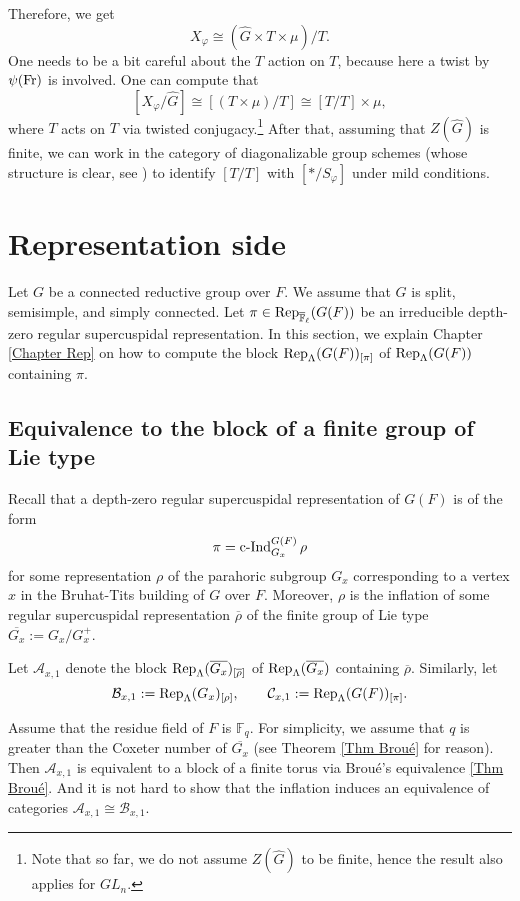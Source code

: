 Therefore, we get 
$$X_{\varphi} \cong \left(\hat{G} \times T \times \mu\right)/T.$$
One needs to be a bit careful about the $T$ action on $T$, because here a twist by $\psi(\operatorname{Fr})$ is involved. One can compute that 
$$[X_{\varphi}/\hat{G}] \cong [\left(T \times \mu\right)/T] \cong [T/T] \times \mu,$$
where $T$ acts on $T$ via twisted conjugacy.\footnote{Note that so far, we do not assume $Z(\hat{G})$ to be finite, hence the result also applies for $GL_n$.} After that, assuming that $Z(\hat{G})$ is finite, we can work in the category of diagonalizable group schemes (whose structure is clear, see \cite[p70, Section 5]{brochard2014autour}) to identify $[T/T]$ with $[*/S_{\varphi}]$ under mild conditions.

\section{Representation side}
Let $G$ be a connected reductive group over $F$. We assume that $G$ is split, semisimple, and simply connected. Let $\pi \in \operatorname{\operatorname{Rep}}_{\overline{\mathbb{F}}_{\ell}}(G(F))$ be an irreducible depth-zero regular supercuspidal representation. In this section, we explain Chapter \ref{Chapter Rep} on how to compute the block $\operatorname{\operatorname{Rep}}_{\Lambda}(G(F))_{[\pi]}$ of $\operatorname{\operatorname{Rep}}_{\Lambda}(G(F))$ containing $\pi$.

\subsection{Equivalence to the block of a finite group of Lie type}

Recall that a depth-zero regular supercuspidal representation of $G(F)$ is of the form
$$\pi=\operatorname{\operatorname{c-Ind}}_{G_x}^{G(F)}\rho$$
for some representation $\rho$ of the parahoric subgroup $G_x$ corresponding to a vertex $x$ in the Bruhat-Tits building of $G$ over $F$. Moreover, $\rho$ is the inflation of some regular supercuspidal representation $\overline{\rho}$ of the finite group of Lie type $\overline{G_x}:=G_x/G_x^+$.

Let $\mathcal{A}_{x,1}$ denote the block $\operatorname{\operatorname{Rep}}_{\Lambda}(\overline{G_x})_{[\overline{\rho}]}$ of $\operatorname{\operatorname{Rep}}_{\Lambda}(\overline{G_x})$ containing $\overline{\rho}$. Similarly, let 
$$\mathcal{B}_{x,1}:=\operatorname{\operatorname{Rep}}_{\Lambda}(G_x)_{[\rho]},\qquad \mathcal{C}_{x,1}:=\operatorname{\operatorname{Rep}}_{\Lambda}(G(F))_{[\pi]}.$$

Assume that the residue field of $F$ is $\mathbb{F}_q$. For simplicity, we assume that $q$ is greater than the Coxeter number of $\overline{G_x}$ (see Theorem \ref{Thm Broué} for reason). Then $\mathcal{A}_{x,1}$ is equivalent to a block of a finite torus via Broué's equivalence \ref{Thm Broué}. And it is not hard to show that the inflation induces an equivalence of categories $\mathcal{A}_{x,1} \cong \mathcal{B}_{x,1}$.


